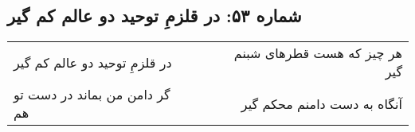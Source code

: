 \begin{center}
\section*{شماره ۵۳: در قلزمِ توحید دو عالم کم گیر}
\label{sec:053}
\begin{longtable}{l p{0.5cm} r}
در قلزمِ توحید دو عالم کم گیر
&&
هر چیز که هست قطرهای شبنم گیر
\\
گر دامن من بماند در دست تو هم
&&
آنگاه به دست دامنم محکم گیر
\\
\end{longtable}
\end{center}
